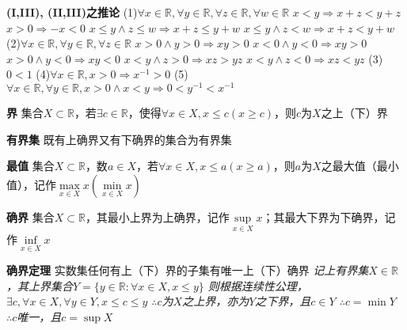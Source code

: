 \documentclass[11pt]{article}
\begin{document}
\textbf{(I,III), (II,III)之推论} \newline
(1)$\forall x \in \mathbb{R}, \forall y \in \mathbb{R}, \forall z \in \mathbb{R}, \forall w \in \mathbb{R}$ \newline
$x<y \Rightarrow x+z<y+z$ \newline
$x>0 \Rightarrow -x<0$ \newline
$x \le y \land z \le w \Rightarrow x+z \le y+w$ \newline
$x \le y \land z<w \Rightarrow x+z<y+w$ \newline
(2)$\forall x \in \mathbb{R}, \forall y \in \mathbb{R}, \forall z \in \mathbb{R}$ \newline
$x>0 \land y>0 \Rightarrow xy>0$ \newline
$x<0 \land y<0 \Rightarrow xy>0$ \newline
$x>0 \land y<0 \Rightarrow xy<0$ \newline
$x<y \land z>0 \Rightarrow xz>yz$ \newline
$x<y \land z<0 \Rightarrow xz<yz$ \newline
(3)$0<1$ \newline
(4)$\forall x \in \mathbb{R}, x>0 \Rightarrow x^{-1}>0$ \newline
(5)$\forall x \in \mathbb{R}, \forall y \in \mathbb{R}, x>0 \land x<y \Rightarrow 0<y^{-1}<x^{-1}$ \newline

\textbf{界} \newline
集合$X \subset \mathbb{R}$，若$\exists c \in \mathbb{R}$，使得$\forall x \in X, x \le c (x \ge c)$，则$c$为$X$之上（下）界 \newline

\textbf{有界集} \newline
既有上确界又有下确界的集合为有界集 \newline

\textbf{最值} \newline
集合$X \subset \mathbb{R}$，数$a \in X$，若$\forall x \in X, x \le a (x \ge a)$，则$a$为$X$之最大值（最小值），记作$\max\limits_{x\in X}x (\min\limits_{x\in X}x)$ \newline

\textbf{确界} \newline
集合$X \subset \mathbb{R}$，其最小上界为上确界，记作$\sup\limits_{x \in X}x$；其最大下界为下确界，记作$\inf\limits_{x \in X}x$ \newline

\textbf{确界定理} \newline
实数集任何有上（下）界的子集有唯一上（下）确界 \newline
\textit{记上有界集$X\in\mathbb{R}$，其上界集合$Y=\{y\in\mathbb{R}:\forall x \in X, x\le y\}$ \newline
则根据连续性公理，$\exists c, \forall x \in X, \forall y \in Y, x \le c \le y$ \newline
$\therefore$$c$为$X$之上界，亦为$Y$之下界，且$c \in Y$ \newline
$\therefore c=\min Y$ \newline
$\therefore$$c$唯一，且$c=\sup X$}
\end{document}
